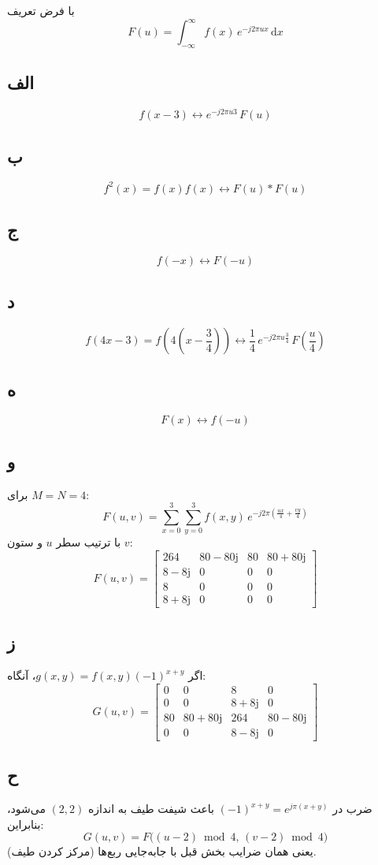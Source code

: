 با فرض تعریف
$$F(u)=\int_{-\infty}^{\infty} f(x)\, e^{-j2\pi u x}\, \mathrm{d}x$$

\subsection*{الف}
$$f(x-3) \longleftrightarrow e^{-j2\pi u 3}\, F(u)$$

\subsection*{ب}
$$f^2(x)=f(x)f(x) \longleftrightarrow F(u)\ast F(u)$$

\subsection*{ج}
$$f(-x) \longleftrightarrow F(-u)$$

\subsection*{د}
$$f(4x-3)=f\!\left(4\left(x-\frac{3}{4}\right)\right)\longleftrightarrow \frac{1}{4}\, e^{-j2\pi u \frac{3}{4}}\, F\!\left(\frac{u}{4}\right)$$

\subsection*{ه}
$$F(x) \longleftrightarrow f(-u)$$

\subsection*{و}
برای $M=N=4$:
$$F(u,v)=\sum_{x=0}^{3}\sum_{y=0}^{3} f(x,y)\, e^{-j2\pi\left(\frac{ux}{4}+\frac{vy}{4}\right)}$$
با ترتیب سطر $u$ و ستون $v$:
$$
F(u,v)=
\begin{bmatrix}
264 & 80-80\mathrm{j} & 80 & 80+80\mathrm{j}\\
8-8\mathrm{j} & 0 & 0 & 0\\
8 & 0 & 0 & 0\\
8+8\mathrm{j} & 0 & 0 & 0
\end{bmatrix}
$$

\subsection*{ز}
اگر
$g(x,y)=f(x,y)(-1)^{x+y}$،
آنگاه:
$$
G(u,v)=
\begin{bmatrix}
0 & 0 & 8 & 0\\
0 & 0 & 8+8\mathrm{j} & 0\\
80 & 80+80\mathrm{j} & 264 & 80-80\mathrm{j}\\
0 & 0 & 8-8\mathrm{j} & 0
\end{bmatrix}
$$

\subsection*{ح}
ضرب در $(-1)^{x+y}=e^{j\pi(x+y)}$ باعث شیفت طیف به اندازه
$(2,2)$
می‌شود، بنابراین:
$$G(u,v)=F\big((u-2)\bmod 4,\,(v-2)\bmod 4\big)$$
یعنی همان ضرایب بخش قبل با جابه‌جایی ربع‌ها (مرکز کردن طیف).